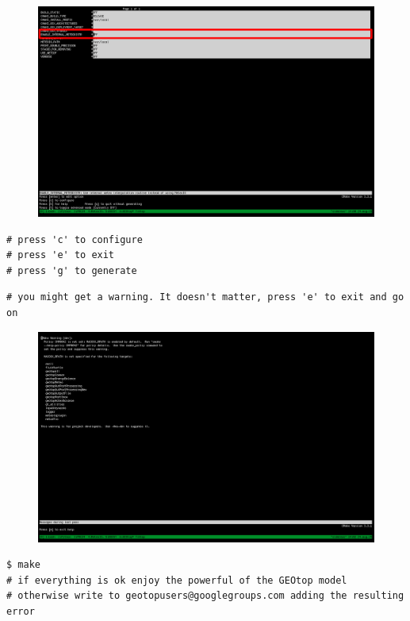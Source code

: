 \begin{itemize}
\pagebreak

\begin{figure}[h]
  \includegraphics[width=\linewidth]{2015/Aug/24/4picGT.png}
\end{figure}

\begin{lstlisting}[style=bashStyle]
# press 'c' to configure
# press 'e' to exit
# press 'g' to generate
\end{lstlisting}

\pagebreak

\begin{lstlisting}[style=bashStyle]
# you might get a warning. It doesn't matter, press 'e' to exit and go on
\end{lstlisting}

\begin{figure}[h]
  \includegraphics[width=\linewidth]{2015/Aug/24/5picGT.png}
\end{figure}

\begin{lstlisting}[style=bashStyle]
$ make
# if everything is ok enjoy the powerful of the GEOtop model
# otherwise write to geotopusers@googlegroups.com adding the resulting error
\end{lstlisting} %
  
\end{itemize}

